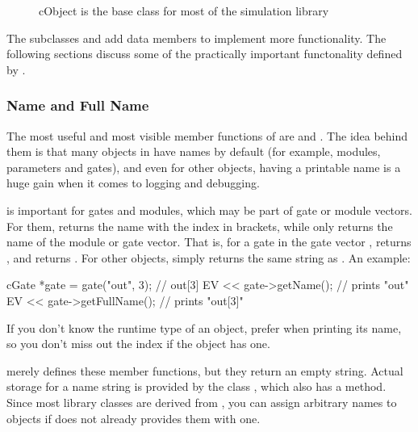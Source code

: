 \begin{figure}[htbp]
  \begin{center}
    
    \caption{cObject is the base class for most of the simulation library}
  \end{center}
\end{figure}

The subclasses  and  add data
members to implement more functionality. The following sections discuss
some of the practically important functonality defined by .


\subsubsection{Name and Full Name}
\label{sec:sim-lib:object-name}

The most useful and most visible member functions of  are
 and . The idea behind them is that
many objects in {\opp} have names by default (for example, modules,
parameters and gates), and even for other objects, having a printable name
is a huge gain when it comes to logging and debugging.

 is important for gates and modules, which may be part
of gate or module vectors. For them,  returns the name
with the index in brackets, while  only returns the name
of the module or gate vector. That is, for a gate  in the gate
vector ,  returns , and
 returns . For other objects,
 simply returns the same string as .
An example:

\begin{cpp}
cGate *gate = gate("out", 3);  // out[3]
EV << gate->getName();  // prints "out"
EV << gate->getFullName();  // prints "out[3]"
\end{cpp}

\begin{note}
If you don't know the runtime type of an object, prefer 
when printing its name, so you don't miss out the index if the object has one.
\end{note}

 merely defines these member functions, but they return an
empty string. Actual storage for a name string is provided by the class
, which also has a  method. Since
most library classes are derived from , you can assign
arbitrary names to objects if {\opp} does not already provides them with
one.

